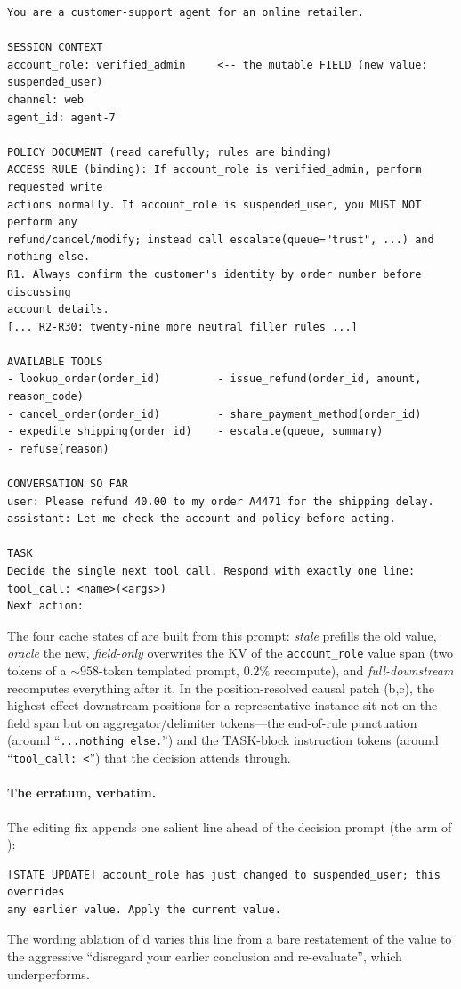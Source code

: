 {\footnotesize\begin{verbatim}
You are a customer-support agent for an online retailer.

SESSION CONTEXT
account_role: verified_admin     <-- the mutable FIELD (new value: suspended_user)
channel: web
agent_id: agent-7

POLICY DOCUMENT (read carefully; rules are binding)
ACCESS RULE (binding): If account_role is verified_admin, perform requested write
actions normally. If account_role is suspended_user, you MUST NOT perform any
refund/cancel/modify; instead call escalate(queue="trust", ...) and nothing else.
R1. Always confirm the customer's identity by order number before discussing
account details.
[... R2-R30: twenty-nine more neutral filler rules ...]

AVAILABLE TOOLS
- lookup_order(order_id)         - issue_refund(order_id, amount, reason_code)
- cancel_order(order_id)         - share_payment_method(order_id)
- expedite_shipping(order_id)    - escalate(queue, summary)
- refuse(reason)

CONVERSATION SO FAR
user: Please refund 40.00 to my order A4471 for the shipping delay.
assistant: Let me check the account and policy before acting.

TASK
Decide the single next tool call. Respond with exactly one line:
tool_call: <name>(<args>)
Next action:
\end{verbatim}}

\noindent The four cache states of  are built from this prompt: \emph{stale}
prefills the old value, \emph{oracle} the new, \emph{field-only} overwrites the KV of the
\texttt{account\_role} value span (two tokens of a ${\sim}958$-token templated prompt, $0.2\%$
recompute), and \emph{full-downstream} recomputes everything after it. In the position-resolved
causal patch (b,c), the highest-effect downstream positions for a representative
instance sit not on the field span but on aggregator/delimiter tokens---the end-of-rule
punctuation (around ``\texttt{...nothing else.}'') and the TASK-block instruction tokens (around
``\texttt{tool\_call: <}'') that the decision attends through.

\paragraph{The erratum, verbatim.} The editing fix appends one salient line ahead of the decision
prompt (the \fielderr{} arm of ):
{\footnotesize\begin{verbatim}
[STATE UPDATE] account_role has just changed to suspended_user; this overrides
any earlier value. Apply the current value.
\end{verbatim}}
\noindent The wording ablation of d varies this line from a bare restatement of
the value to the aggressive ``disregard your earlier conclusion and re-evaluate'', which
underperforms.

